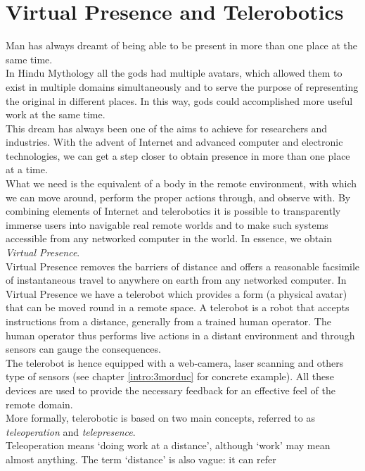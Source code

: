 \section{Virtual Presence and Telerobotics}
\label{intro:virtual_presence}

Man has always dreamt of being able to be present in more than
one place at the same time.
\\
In Hindu Mythology all the gods had multiple avatars, which
allowed them to exist in multiple domains simultaneously and to
serve the purpose of representing the original in different
places. In this way, gods could accomplished more useful work
at the same time. 
\\
This dream has always been one of the aims to achieve for 
researchers and industries. With the advent of Internet and
advanced computer and electronic technologies, we can get a
step closer to obtain presence in more than one place
at a time.
\\
What we need is the equivalent of a body in the remote environment,
with which we can move around, perform the proper actions through,
and observe with. By combining elements of Internet and
telerobotics it is possible to transparently immerse users into
navigable real remote worlds and to make such systems accessible
from any networked computer in the world. In essence, we obtain
\textit{Virtual Presence}.
\\
Virtual Presence removes the barriers of distance and offers a
reasonable facsimile of instantaneous travel to anywhere on earth
from any networked computer.
In Virtual Presence we have a telerobot which provides a form
(a physical avatar) that can be moved round in a remote space.
A telerobot is a robot that accepts instructions from a distance,
generally from a trained human operator. The human operator thus
performs live actions in a distant environment and through sensors
can gauge the consequences.
\\
The telerobot is hence equipped with a web-camera, laser scanning and
others type of sensors (see chapter \ref{intro:3morduc} for \morduc{}
concrete example). All these devices are used to provide the
necessary feedback for an effective feel of the remote domain.
\\
More formally, telerobotic is based on two main concepts, referred to
as \textit{teleoperation} and \textit{telepresence}.
\\
Teleoperation means `doing work at a distance', although `work' may
mean almost anything. The term `distance' is also vague: it can refer
